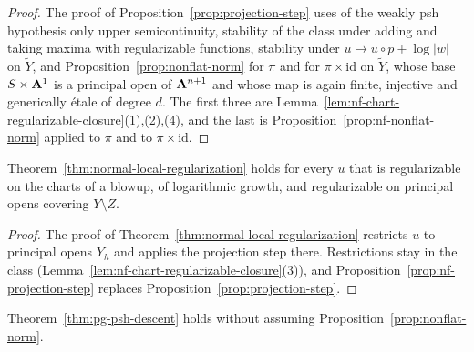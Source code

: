 \begin{proof}
The proof of Proposition~\ref{prop:projection-step} uses of the weakly psh hypothesis only upper semicontinuity, stability
of the class under adding and taking maxima with regularizable functions, stability under $u\mapsto u\circ p+\log|w|$ on
$\widetilde Y$, and Proposition~\ref{prop:nonflat-norm} for $\pi$ and for $\pi\times\mathrm{id}$ on $\widetilde Y$, whose
base $S\times\mathbf{A}^1$ is a principal open of $\mathbf{A}^{n+1}$ and whose map is again finite, injective and generically \'etale of
degree $d$. The first three are Lemma~\ref{lem:nf-chart-regularizable-closure}(1),(2),(4), and the last is
Proposition~\ref{prop:nf-nonflat-norm} applied to $\pi$ and to $\pi\times\mathrm{id}$.
\end{proof}

\begin{theorem}\label{thm:nf-local-regularization}
\leanok
{}
Theorem~\ref{thm:normal-local-regularization} holds for every $u$ that is regularizable on the charts of a blowup, of
logarithmic growth, and regularizable on principal opens covering $Y\setminus Z$.
\end{theorem}

\begin{proof}
The proof of Theorem~\ref{thm:normal-local-regularization} restricts $u$ to principal opens $Y_h$ and applies the
projection step there. Restrictions stay in the class (Lemma~\ref{lem:nf-chart-regularizable-closure}(3)), and
Proposition~\ref{prop:nf-projection-step} replaces Proposition~\ref{prop:projection-step}.
\end{proof}

\begin{corollary}\label{cor:nf-psh-descent}
\leanok
{}
Theorem~\ref{thm:pg-psh-descent} holds without assuming Proposition~\ref{prop:nonflat-norm}.
\end{corollary}

